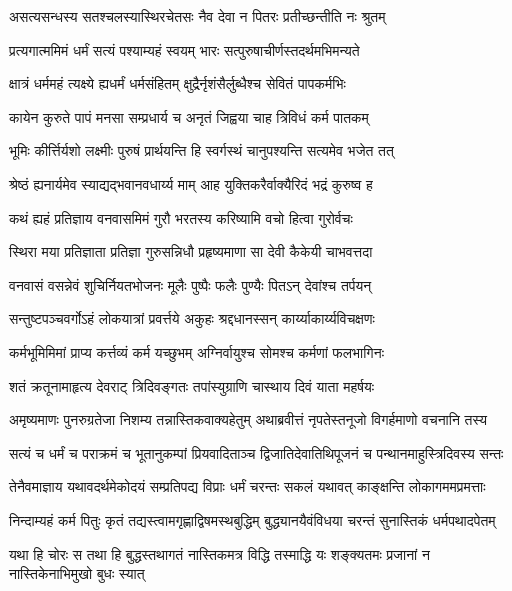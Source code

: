 \twolineshloka
{असत्यसन्धस्य सतश्चलस्यास्थिरचेतसः}
{नैव देवा न पितरः प्रतीच्छन्तीति नः श्रुतम्} %

\twolineshloka
{प्रत्यगात्ममिमं धर्मं सत्यं पश्याम्यहं स्वयम्}
{भारः सत्पुरुषाचीर्णस्तदर्थमभिमन्यते} %

\twolineshloka
{क्षात्रं धर्ममहं त्यक्ष्ये ह्यधर्मं धर्मसंहितम्}
{क्षुद्रैर्नृशंसैर्लुब्धैश्च सेवितं पापकर्मभिः} %

\twolineshloka
{कायेन कुरुते पापं मनसा सम्प्रधार्य च}
{अनृतं जिह्वया चाह त्रिविधं कर्म पातकम्} %

\twolineshloka
{भूमिः कीर्त्तिर्यशो लक्ष्मीः पुरुषं प्रार्थयन्ति हि}
{स्वर्गस्थं चानुपश्यन्ति सत्यमेव भजेत तत्} %

\twolineshloka
{श्रेष्ठं ह्यनार्यमेव स्याद्यद्भवानवधार्य्य माम्}
{आह युक्तिकरैर्वाक्यैरिदं भद्रं कुरुष्व ह} %

\twolineshloka
{कथं ह्यहं प्रतिज्ञाय वनवासमिमं गुरौ}
{भरतस्य करिष्यामि वचो हित्वा गुरोर्वचः} %

\twolineshloka
{स्थिरा मया प्रतिज्ञाता प्रतिज्ञा गुरुसन्निधौ}
{प्रहृष्यमाणा सा देवी कैकेयी चाभवत्तदा} %

\twolineshloka
{वनवासं वसन्नेवं शुचिर्नियतभोजनः}
{मूलैः पुष्पैः फलैः पुण्यैः पितऽन् देवांश्च तर्पयन्} %

\twolineshloka
{सन्तुष्टपञ्चवर्गोऽहं लोकयात्रां प्रवर्त्तये}
{अकुहः श्रद्दधानस्सन् कार्य्याकार्य्यविचक्षणः} %

\twolineshloka
{कर्मभूमिमिमां प्राप्य कर्त्तव्यं कर्म यच्छुभम्}
{अग्निर्वायुश्च सोमश्च कर्मणां फलभागिनः} %

\twolineshloka
{शतं क्रतूनामाहृत्य देवराट् त्रिदिवङ्गतः}
{तपांस्युग्राणि चास्थाय दिवं याता महर्षयः} %

\twolineshloka
{अमृष्यमाणः पुनरुग्रतेजा निशम्य तन्नास्तिकवाक्यहेतुम्}
{अथाब्रवीत्तं नृपतेस्तनूजो विगर्हमाणो वचनानि तस्य} %

\twolineshloka
{सत्यं च धर्मं च पराक्रमं च भूतानुकम्पां प्रियवादिताञ्च}
{द्विजातिदेवातिथिपूजनं च पन्थानमाहुस्त्रिदिवस्य सन्तः} %

\twolineshloka
{तेनैवमाज्ञाय यथावदर्थमेकोदयं सम्प्रतिपद्य विप्राः}
{धर्मं चरन्तः सकलं यथावत् काङ्क्षन्ति लोकागममप्रमत्ताः} %

\twolineshloka
{निन्दाम्यहं कर्म पितुः कृतं तद्यस्त्वामगृह्णाद्विषमस्थबुद्धिम्}
{बुद्ध्यानयैवंविधया चरन्तं सुनास्तिकं धर्मपथादपेतम्} %

\twolineshloka
{यथा हि चोरः स तथा हि बुद्धस्तथागतं नास्तिकमत्र विद्धि}
{तस्माद्धि यः शङ्क्यतमः प्रजानां न नास्तिकेनाभिमुखो बुधः स्यात्} %

